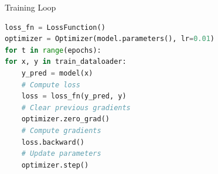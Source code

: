 \documentclass{beamer}
\begin{document}

\begin{frame}[fragile]{Training Loop}
    \begin{exampleblock}{}
        \begin{lstlisting}[language=Python]
loss_fn = LossFunction()
optimizer = Optimizer(model.parameters(), lr=0.01)
for t in range(epochs):
for x, y in train_dataloader:
    y_pred = model(x)
    # Compute loss
    loss = loss_fn(y_pred, y)
    # Clear previous gradients
    optimizer.zero_grad()
    # Compute gradients
    loss.backward()
    # Update parameters
    optimizer.step()
        \end{lstlisting}
    \end{exampleblock}
\end{frame}
\end{document}
